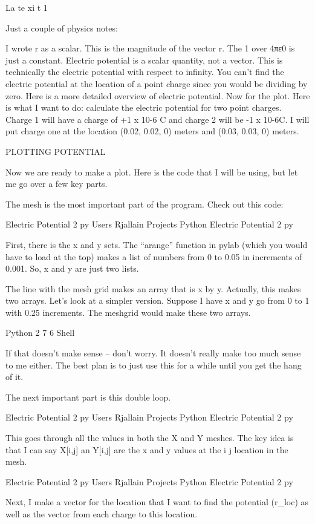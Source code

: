 La te xi t 1

Just a couple of physics notes:

I wrote r as a scalar. This is the magnitude of the vector r.
The 1 over 4πε0 is just a constant.
Electric potential is a scalar quantity, not a vector.
This is technically the electric potential with respect to infinity.
You can’t find the electric potential at the location of a point charge since you would be dividing by zero.
Here is a more detailed overview of electric potential.
Now for the plot. Here is what I want to do: calculate the electric potential for two point charges. Charge 1 will have a charge of +1 x 10-6 C and charge 2 will be -1 x 10-6C. I will put charge one at the location (0.02, 0.02, 0) meters and (0.03, 0.03, 0) meters.

PLOTTING POTENTIAL

Now we are ready to make a plot. Here is the code that I will be using, but let me go over a few key parts.

The mesh is the most important part of the program. Check out this code:

 Electric Potential 2 py    Users Rjallain Projects Python Electric Potential 2 py 

First, there is the x and y sets. The “arange” function in pylab (which you would have to load at the top) makes a list of numbers from 0 to 0.05 in increments of 0.001. So, x and y are just two lists.

The line with the mesh grid makes an array that is x by y. Actually, this makes two arrays. Let’s look at a simpler version. Suppose I have x and y go from 0 to 1 with 0.25 increments. The meshgrid would make these two arrays.

Python 2 7 6 Shell


If that doesn’t make sense – don’t worry. It doesn’t really make too much sense to me either. The best plan is to just use this for a while until you get the hang of it.

The next important part is this double loop.

 Electric Potential 2 py    Users Rjallain Projects Python Electric Potential 2 py 

This goes through all the values in both the X and Y meshes. The key idea is that I can say X[i,j] an Y[i,j] are the x and y values at the i j location in the mesh.

 Electric Potential 2 py    Users Rjallain Projects Python Electric Potential 2 py 

Next, I make a vector for the location that I want to find the potential (r_loc) as well as the vector from each charge to this location.

